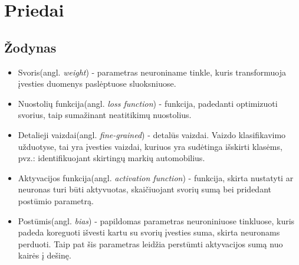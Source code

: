 \documentclass{VUMIFPSkursinis}
\DeclareRobustCommand{\[}{\begin{equation}}
\DeclareRobustCommand{\]}{\end{equation}}
\begin{document}
\section{Priedai}
\thispagestyle{empty} 
\subsection{Žodynas}
\begin{itemize}
\item{Svoris(angl. \textit{weight}) - parametras neuroniname tinkle, kuris transformuoja įvesties duomenys paslėptuose sluoksniuose.}
\item{Nuostolių funkcija(angl. \textit{loss function}) - funkcija, padedanti optimizuoti svorius, taip sumažinant neatitikimų nuostolius.}
\item{Detalieji vaizdai(angl. \textit{fine-grained}) - detalūs vaizdai. Vaizdo klasifikavimo užduotyse, tai yra įvesties vaizdai, kuriuos yra sudėtinga išskirti klasėms, pvz.: identifikuojant skirtingų markių automobilius.}
\item{Aktyvacijos funkcija(angl. \textit{activation function}) - funkcija, skirta nustatyti ar neuronas turi būti aktyvuotas, skaičiuojant svorių sumą bei pridedant postūmio parametrą.}
\item{Postūmis(angl. \textit{bias}) - papildomas parametras neuroniniuose tinkluose, kuris padeda koreguoti išvesti kartu su svorių įvesties suma, skirta neuronams perduoti. Taip pat šis parametras leidžia perstūmti aktyvacijos sumą nuo kairės į dešinę.}
\end{itemize} 
\pagebreak

\printbibliography[heading=bibintoc] 
\thispagestyle{empty}
\end{document}
